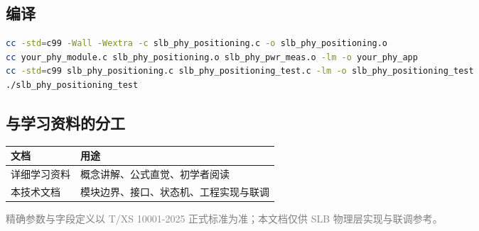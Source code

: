 \documentclass[11pt,a4paper]{ctexart}
\begin{document}
\subsection{编译}

\begin{lstlisting}[language=bash]
cc -std=c99 -Wall -Wextra -c slb_phy_positioning.c -o slb_phy_positioning.o
cc your_phy_module.c slb_phy_positioning.o slb_phy_pwr_meas.o -lm -o your_phy_app
cc -std=c99 slb_phy_positioning.c slb_phy_positioning_test.c -lm -o slb_phy_positioning_test
./slb_phy_positioning_test
\end{lstlisting}

\subsection{与学习资料的分工}

\begin{table}[h]
\centering
\small
\begin{tabular}{ll}
\toprule
\textbf{文档} & \textbf{用途} \\
\midrule
详细学习资料 & 概念讲解、公式直觉、初学者阅读 \\
本技术文档 & 模块边界、接口、状态机、工程实现与联调 \\
\bottomrule
\end{tabular}
\end{table}

\vfill
\begin{center}
\small\textcolor{gray}{精确参数与字段定义以 T/XS 10001-2025 正式标准为准；本文档仅供 SLB 物理层实现与联调参考。}
\end{center}
\end{document}
